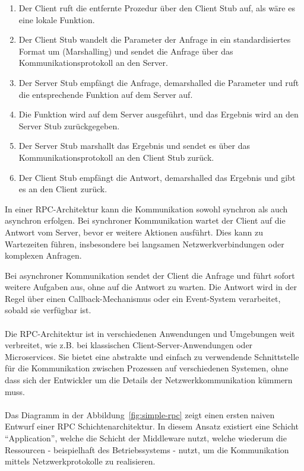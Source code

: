 \documentclass[../vs-script-first-v01.tex]{subfiles}
\begin{document}
\begin{enumerate} 
\item Der Client ruft die entfernte Prozedur über den Client Stub auf, als wäre es eine lokale Funktion.
\item Der Client Stub wandelt die Parameter der Anfrage in ein standardisiertes Format um (Marshalling) und sendet die Anfrage über das Kommunikationsprotokoll an den Server.
\item Der Server Stub empfängt die Anfrage, demarshalled die Parameter und ruft die entsprechende Funktion auf dem Server auf.
\item Die Funktion wird auf dem Server ausgeführt, und das Ergebnis wird an den Server Stub zurückgegeben.
\item Der Server Stub marshallt das Ergebnis und sendet es über das Kommunikationsprotokoll an den Client Stub zurück.
\item Der Client Stub empfängt die Antwort, demarshalled das Ergebnis und gibt es an den Client zurück.
\end{enumerate}
In einer RPC-Architektur kann die Kommunikation sowohl synchron als auch asynchron erfolgen. Bei synchroner Kommunikation wartet der Client auf die Antwort vom Server, bevor er weitere Aktionen ausführt. Dies kann zu Wartezeiten führen, insbesondere bei langsamen Netzwerkverbindungen oder komplexen Anfragen. 

Bei asynchroner Kommunikation sendet der Client die Anfrage und führt sofort weitere Aufgaben aus, ohne auf die Antwort zu warten. Die Antwort wird in der Regel über einen Callback-Mechanismus oder ein Event-System verarbeitet, sobald sie verfügbar ist.
\\\\
Die RPC-Architektur ist in verschiedenen Anwendungen und Umgebungen weit verbreitet, wie z.B. bei klassischen Client-Server-Anwendungen oder Microservices. Sie bietet eine abstrakte und einfach zu verwendende Schnittstelle für die Kommunikation zwischen Prozessen auf verschiedenen Systemen, ohne dass sich der Entwickler um die Details der Netzwerkkommunikation kümmern muss.
\\\\
Das Diagramm in der Abbildung~\ref{fig:simple-rpc} zeigt einen ersten naiven Entwurf einer RPC Schichtenarchitektur. In diesem Ansatz existiert eine Schicht \enquote{Application}, welche die Schicht der Middleware nutzt, welche wiederum die Ressourcen - beispielhaft des Betriebssystems - nutzt, um die Kommunikation mittels Netzwerkprotokolle zu realisieren. \\\\
\end{document}
